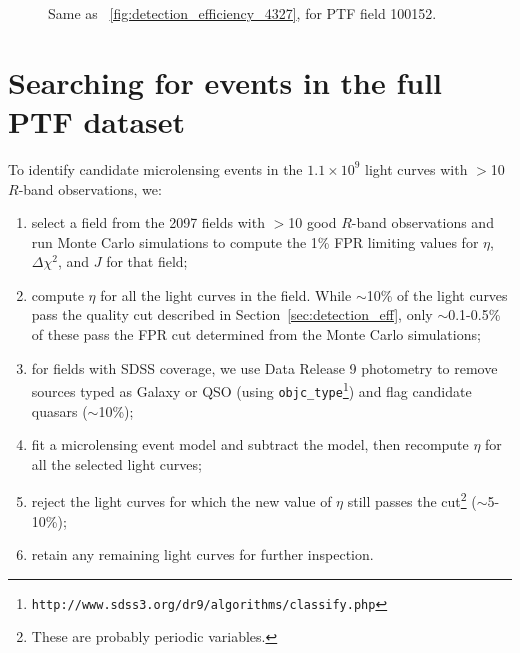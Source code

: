 \documentclass{emulateapj}
\begin{document}
\begin{figure}
\centering
	
\caption{Same as \figurename~\ref{fig:detection_efficiency_4327}, for PTF field 100152.}\label{fig:detection_efficiency_100152}
\end{figure}

\section{Searching for events in the full PTF dataset}\label{sec:search}
To identify candidate microlensing events in the $1.1\times10^9$ light curves with $>$10 $R$-band observations, we:
\begin{enumerate}
	\item select a field from the 2097 fields with $>$10 good $R$-band observations and run Monte Carlo simulations to compute the 1\% FPR limiting values for $\eta$, $\Delta \chi^2$, and $J$ for that field;
	\item compute $\eta$ for all the light curves in the field. While $\sim$10\% of the light curves pass the quality cut described in Section~\ref{sec:detection_eff}, only $\sim$0.1-0.5\% of these pass the FPR cut determined from the Monte Carlo simulations;
	\item for fields with SDSS coverage, we use Data Release 9 photometry \citep{dr9paper} to remove sources typed as Galaxy or QSO (using \texttt{objc\_type}\footnote{{\tt http://www.sdss3.org/dr9/algorithms/classify.php}}) and flag candidate quasars \citep[using the cuts described in][]{richards02} ($\sim$10\%);
	\item fit a microlensing event model and subtract the model, then recompute $\eta$ for all the selected light curves;
	\item reject the light curves for which the new value of $\eta$ still passes the cut\footnote{These are probably periodic variables.} ($\sim$5-10\%);
	\item retain any remaining light curves for further inspection.
\end{enumerate}
\end{document}
